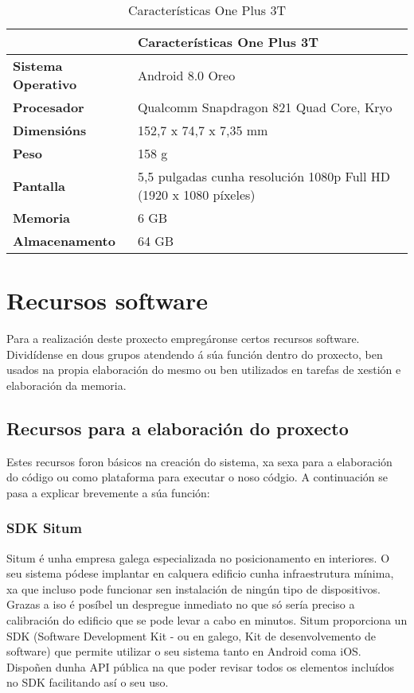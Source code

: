 \begin{table} [tbp]
	\begin{tabular}{|l|p{10cm}|}
		\hline 
		& \textbf{Características One Plus 3T} \\ 
		\hline 
		\textbf{Sistema Operativo} & Android 8.0 Oreo \\ 
		\hline 
		\textbf{Procesador} & Qualcomm Snapdragon 821 Quad Core, Kryo \\ 
		\hline 
		\textbf{Dimensións} & 152,7 x 74,7 x 7,35 mm \\ 
		\hline 
		\textbf{Peso} & 158 g \\ 
		\hline 
		\textbf{Pantalla} & 5,5 pulgadas cunha resolución 1080p Full HD (1920 x 1080 píxeles) \\ 
		\hline 
		\textbf{Memoria} & 6 GB \\ 
		\hline
		\textbf{Almacenamento} & 64 GB \\ 
		\hline 
	\end{tabular}
	\caption{Características One Plus 3T}
	\label{tab:tabCaracteristicasOnePlus}
\end{table}


\section{Recursos software}
Para a realización deste proxecto empregáronse certos recursos software. Dividídense en dous grupos atendendo á súa función dentro do proxecto, ben usados na propia elaboración do mesmo ou ben utilizados en tarefas de xestión e elaboración da memoria.

\subsection{Recursos para a elaboración do proxecto}
Estes recursos foron básicos na creación do sistema, xa sexa para a elaboración do código ou como plataforma para executar o noso códgio. A continuación se pasa a explicar brevemente a súa función:

\subsubsection{SDK Situm}
Situm é unha empresa galega especializada no posicionamento en interiores. O seu sistema pódese implantar en calquera edificio cunha infraestrutura mínima, xa que incluso pode funcionar sen instalación de ningún tipo de dispositivos. Grazas a iso é posíbel un despregue inmediato no que só sería preciso a calibración do edificio que se pode levar a cabo en minutos. Situm proporciona un SDK (Software Development Kit - ou en galego, Kit de desenvolvemento de software) que permite utilizar o seu sistema tanto en Android coma iOS. Dispoñen dunha API pública na que poder revisar todos os elementos incluídos no SDK facilitando así o seu uso.



